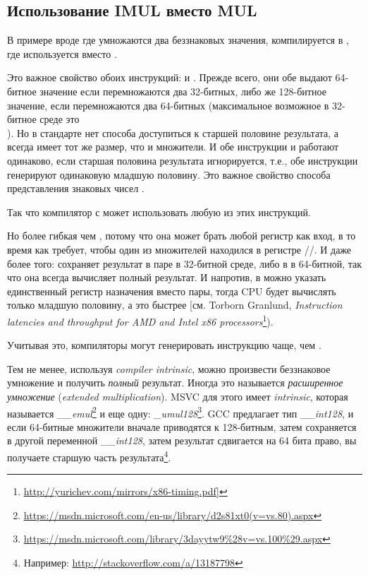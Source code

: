 \subsection{Использование IMUL вместо MUL}
\label{IMUL_over_MUL}

В примере вроде  где умножаются два беззнаковых значения, компилируется в
, где используется \IMUL вместо \MUL.

Это важное свойство обоих инструкций: \MUL и \IMUL{}.
Прежде всего, они обе выдают 64-битное значение если перемножаются два 32-битных, либо же 128-битное значение,
если перемножаются два 64-битных (максимальное возможное  в 32-битное среде это \\
).
Но в стандарте \CCpp нет способа доступиться к старшей половине результата, а  всегда имеет
тот же размер, что и множители. %
И обе инструкции \MUL и \IMUL работают одинаково, если старшая половина результата игнорируется, т.е., обе инструкции
генерируют одинаковую младшую половину.
Это важное свойство способа представления знаковых чисел .

Так что компилятор с \CCpp может использовать любую из этих инструкций.

Но \IMUL более гибкая чем \MUL, потому что она может брать любой регистр как вход, в то время как \MUL требует,
чтобы один из множителей находился в регистре \AX/\EAX/\RAX.
И даже более того: \MUL сохраняет результат в паре  в 32-битной среде, либо в  в 64-битной,
так что она всегда вычисляет полный результат.
И напротив, в \IMUL можно указать единственный регистр назначения вместо пары, тогда \ac{CPU} будет вычислять только
младшую половину, а это быстрее
[см. Torborn Granlund, \emph{Instruction latencies and throughput for AMD and Intel x86 processors}\footnote{\url{http://yurichev.com/mirrors/x86-timing.pdf}]}).

Учитывая это, компиляторы \CCpp могут генерировать инструкцию \IMUL чаще, чем \MUL.

Тем не менее, используя \emph{compiler intrinsic}, можно произвести беззнаковое умножение и получить \emph{полный} результат.
Иногда это называется \emph{расширенное умножение} (\emph{extended multiplication}).
MSVC для этого имеет \emph{intrinsic}, которая называется \emph{\_\_emul}\footnote{\url{https://msdn.microsoft.com/en-us/library/d2s81xt0(v=vs.80).aspx}} и еще одну: \emph{\_umul128}\footnote{\url{https://msdn.microsoft.com/library/3dayytw9%28v=vs.100%29.aspx}}.
GCC предлагает тип \emph{\_\_int128}, и если 64-битные множители вначале приводятся к 128-битным,
затем  сохраняется в другой переменной \emph{\_\_int128}, затем результат сдвигается на 64 бита
право, вы получаете старшую часть результата\footnote{Например: \url{http://stackoverflow.com/a/13187798}}.

